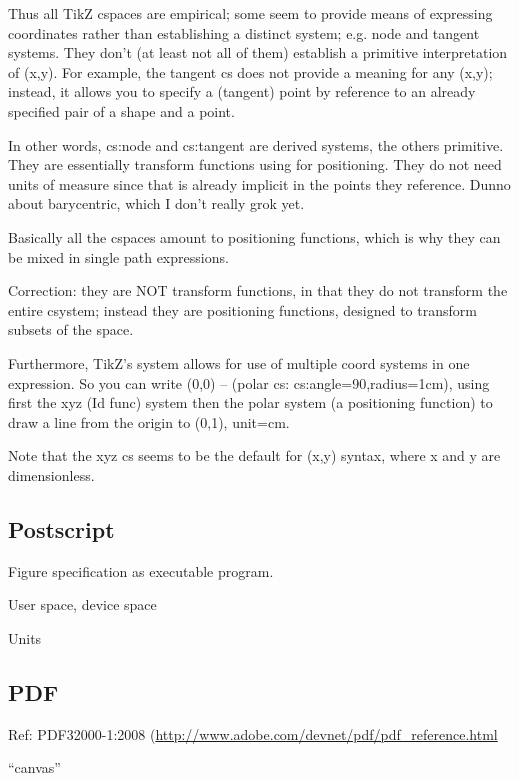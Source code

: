 \documentclass[reqno,12pt]{tufte-handout}
\numberwithin{equation}{subsection}
\numberwithin{equation}{subsection}
\begin{document}
\begin{appendices}
    Thus all TikZ cspaces are empirical; some seem to provide means of
    expressing coordinates rather than establishing a distinct system;
    e.g. node and tangent systems.  They don't (at least not all of them)
    establish a primitive interpretation of (x,y).  For example, the
    tangent cs does not provide a meaning for any (x,y); instead, it
    allows you to specify a (tangent) point by reference to an already
    specified pair of a shape and a point.

    In other words, cs:node and cs:tangent are derived systems, the others
    primitive.  They are essentially transform functions using for
    positioning.  They do not need units of measure since that is already
    implicit in the points they reference.  Dunno about barycentric, which
    I don't really grok yet.

    Basically all the cspaces amount to positioning functions, which is
    why they can be mixed in single path expressions.

    Correction: they are NOT transform functions, in that they do not
    transform the entire csystem; instead they are positioning functions,
    designed to transform subsets of the space.

    Furthermore, TikZ's system allows for use of multiple coord systems in
    one expression.  So you can write (0,0) -- (polar cs:
    cs:angle=90,radius=1cm), using first the xyz (Id func) system then the
    polar system (a positioning function) to draw a line from the origin
    to (0,1), unit=cm.

    Note that the xyz cs seems to be the default for (x,y) syntax, where x
    and y are dimensionless.

    \subsection{Postscript}

    Figure specification as executable program.

    User space, device space

    Units

    \subsection{PDF}

    Ref:  PDF32000-1:2008 (\url{http://www.adobe.com/devnet/pdf/pdf\_reference.html}

    ``canvas''


\end{appendices}
\end{document}
